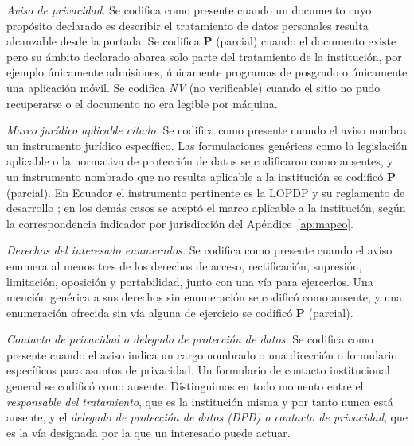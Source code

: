 \documentclass[pdflatex,sn-basic,Numbered,iicol]{sn-jnl}
\newcommand{\nv}{\textsl{\footnotesize NV}}
\theoremstyle{thmstyleone}
\theoremstyle{thmstyletwo}
\theoremstyle{thmstylethree}
\begin{document}
\emph{Aviso de privacidad.} Se codifica como presente cuando un documento cuyo prop\'osito declarado es describir el tratamiento de datos personales resulta alcanzable desde la portada. Se codifica \textbf{P} (parcial) cuando el documento existe pero su \'ambito declarado abarca solo parte del tratamiento de la instituci\'on, por ejemplo \'unicamente admisiones, \'unicamente programas de posgrado o \'unicamente una aplicaci\'on m\'ovil. Se codifica \nv{} (no verificable) cuando el sitio no pudo recuperarse o el documento no era legible por m\'aquina.

\emph{Marco jur\'idico aplicable citado.} Se codifica como presente cuando el aviso nombra un instrumento jur\'idico espec\'ifico. Las formulaciones gen\'ericas como \guillemotleft la legislaci\'on aplicable\guillemotright{} o \guillemotleft la normativa de protecci\'on de datos\guillemotright{} se codificaron como ausentes, y un instrumento nombrado que no resulta aplicable a la instituci\'on se codific\'o \textbf{P} (parcial). En Ecuador el instrumento pertinente es la LOPDP y su reglamento de desarrollo \citep{lopdp2021,reglamentolopdp2023}; en los dem\'as casos se acept\'o el marco aplicable a la instituci\'on, seg\'un la correspondencia indicador por jurisdicci\'on del Ap\'endice~\ref{ap:mapeo}.

\emph{Derechos del interesado enumerados.} Se codifica como presente cuando el aviso enumera al menos tres de los derechos de acceso, rectificaci\'on, supresi\'on, limitaci\'on, oposici\'on y portabilidad, junto con una v\'ia para ejercerlos. Una menci\'on gen\'erica a \guillemotleft sus derechos\guillemotright{} sin enumeraci\'on se codific\'o como ausente, y una enumeraci\'on ofrecida sin v\'ia alguna de ejercicio se codific\'o \textbf{P} (parcial).

\emph{Contacto de privacidad o delegado de protecci\'on de datos.} Se codifica como presente cuando el aviso indica un cargo nombrado o una direcci\'on o formulario espec\'ificos para asuntos de privacidad. Un formulario de contacto institucional general se codific\'o como ausente. Distinguimos en todo momento entre el \emph{responsable del tratamiento}, que es la instituci\'on misma y por tanto nunca est\'a ausente, y el \emph{delegado de protecci\'on de datos (DPD) o contacto de privacidad}, que es la v\'ia designada por la que un interesado puede actuar.
\end{document}
